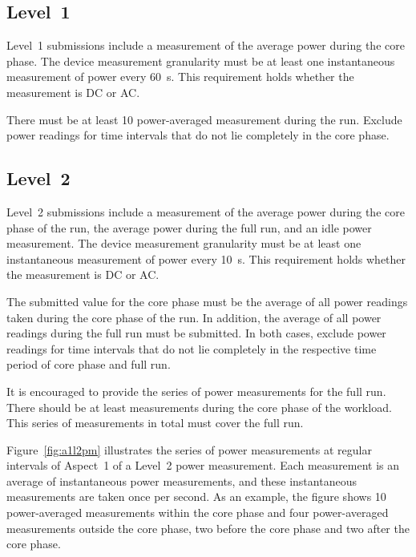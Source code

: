 \subsection{Level~1}
\label{subsec:level_1}
Level~1 submissions include a measurement of the average power during the core phase.
The device measurement granularity must be at least one instantaneous measurement of power every \SI{60}{\second}.
This requirement holds whether the measurement is DC or AC.

There must be at least \num{10} power-averaged measurement during the run.
Exclude power readings for time intervals that do not lie completely in the core phase.

\subsection{Level~2}
\label{subsec:level_2}

Level~2 submissions include a measurement of the average power during the core phase of the run, the average power during the full run, and an idle power measurement.
The device measurement granularity must be at least one instantaneous measurement of power every \SI{10}{\second}.
This requirement holds whether the measurement is DC or AC.

The submitted value for the core phase must be the average of all power readings taken during the core phase of the run.
In addition, the average of all power readings during the full run must be submitted.
In both cases, exclude power readings for time intervals that do not lie completely in the respective time period of core phase and full run.

It is encouraged to provide the series of power measurements for the full run.
There should be at least \MinMeasurementsCorePhaseLTwoThree{} measurements during the core phase of the workload.
This series of measurements in total must cover the full run.

Figure~\ref{fig:a1l2pm} illustrates the series of power measurements at regular intervals of Aspect~1 of a Level~2 power measurement.
Each measurement is an average of instantaneous power measurements, and these instantaneous measurements are taken once per second.
As an example, the figure shows \num{10} power-averaged measurements within the core phase and four power-averaged measurements outside the core phase, two before the core phase and two after the core phase.

